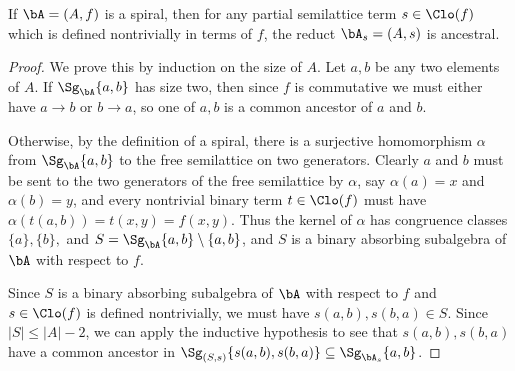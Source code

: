 \begin{thm} If $\bA = (A,f)$ is a spiral, then for any partial semilattice term $s \in \Clo(f)$ which is defined nontrivially in terms of $f$, the reduct $\bA_s = (A,s)$ is ancestral.
\end{thm}
\begin{proof} We prove this by induction on the size of $A$. Let $a,b$ be any two elements of $A$. If $\Sg_\bA\{a,b\}$ has size two, then since $f$ is commutative we must either have $a \rightarrow b$ or $b \rightarrow a$, so one of $a,b$ is a common ancestor of $a$ and $b$.

Otherwise, by the definition of a spiral, there is a surjective homomorphism $\alpha$ from $\Sg_\bA\{a,b\}$ to the free semilattice on two generators. Clearly $a$ and $b$ must be sent to the two generators of the free semilattice by $\alpha$, say $\alpha(a) = x$ and $\alpha(b) = y$, and every nontrivial binary term $t \in \Clo(f)$ must have $\alpha(t(a,b)) = t(x,y) = f(x,y)$. Thus the kernel of $\alpha$ has congruence classes $\{a\}, \{b\},$ and $S = \Sg_\bA\{a,b\}\setminus\{a,b\}$, and $S$ is a binary absorbing subalgebra of $\bA$ with respect to $f$.

Since $S$ is a binary absorbing subalgebra of $\bA$ with respect to $f$ and $s \in \Clo(f)$ is defined nontrivially, we must have $s(a,b), s(b,a) \in S$. Since $|S| \le |A|-2$, we can apply the inductive hypothesis to see that $s(a,b),s(b,a)$ have a common ancestor in $\Sg_{(S,s)}\{s(a,b),s(b,a)\} \subseteq \Sg_{\bA_s}\{a,b\}$.
\end{proof}

